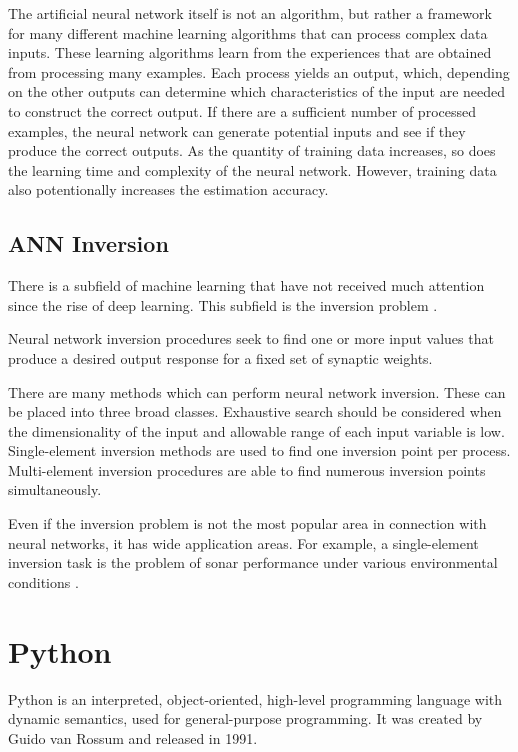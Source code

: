 The artificial neural network itself is not an algorithm, but rather a framework for many different machine learning algorithms that can process complex data inputs. These learning algorithms learn from the experiences that are obtained from processing many examples. Each process yields an output, which, depending on the other outputs can determine which characteristics of the input are needed to construct the correct output. If there are a sufficient number of processed examples, the neural network can generate potential inputs and see if they produce the correct outputs. As the quantity of training data increases, so does the learning time and complexity of the neural network. However, training data also potentionally increases the estimation accuracy.



\subsection{ANN Inversion}

There is a subfield of machine learning that have not received much attention since the rise of deep learning. This subfield is the inversion problem \cite{KINDERMANN1990277}. \smallskip

\label{para:inversion}Neural network inversion procedures seek to find one or more input values that produce a desired output response for a fixed set of synaptic weights. \medskip

There are many methods which can perform neural network inversion. These can be placed into three broad classes. Exhaustive search should be considered when the dimensionality of the input and allowable range of each input variable is low. Single-element inversion methods are used to find one inversion point per process. Multi-element inversion procedures are able to find numerous inversion points simultaneously. \medskip

Even if the inversion problem is not the most popular area in connection with neural networks, it has wide application areas. For example, a single-element inversion task is the problem of sonar performance under various environmental conditions \cite{article}. 



\section{Python}

Python \cite{van2011introduction}\cite{vanderplas2016python} is an interpreted, object-oriented, high-level programming language with dynamic semantics, used for general-purpose programming. It was created by Guido van Rossum and released in 1991. \medskip

